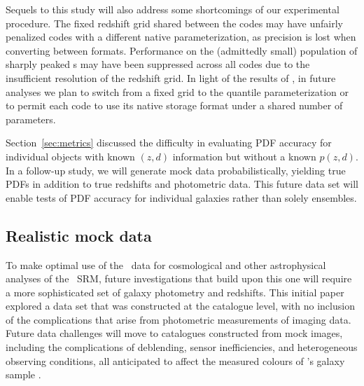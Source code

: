 
Sequels to this study will also address some shortcomings of our experimental procedure.
The fixed redshift grid shared between the codes may have unfairly penalized codes with a different native parameterization, as precision is lost when converting between formats.
Performance on the (admittedly small) population of sharply peaked \pzpdf s may have been suppressed across all codes due to the insufficient resolution of the redshift grid.
In light of the results of \citet[]{Malz:2018}, in future analyses we plan to switch from a fixed grid to the quantile parameterization or to permit each code to use its native storage format under a shared number of parameters.

Section~\ref{sec:metrics} discussed the difficulty in evaluating PDF accuracy for individual objects with known $(z, d)$ information but without a known $p(z, d)$.
In a follow-up study, we will
generate mock data probabilistically, yielding true PDFs in addition to true redshifts and photometric data.
This future data set will enable tests of PDF accuracy for individual galaxies rather than solely ensembles.

\subsection{Realistic mock data}
\label{sec:futuredata}

To make optimal use of the \lsst\ data for cosmological and other astrophysical analyses of the \lsstdesc\ SRM, future investigations that build upon this one will require a more sophisticated set of galaxy photometry and redshifts.
This initial paper explored a data set that was constructed at the catalogue level, with no inclusion of the complications that arise from photometric measurements of imaging data.
Future data challenges will move to catalogues constructed from mock images, including the complications of deblending, sensor inefficiencies, and heterogeneous observing conditions, all anticipated to affect the measured colours of \lsst's galaxy sample \citep{Dawson:2016}.

